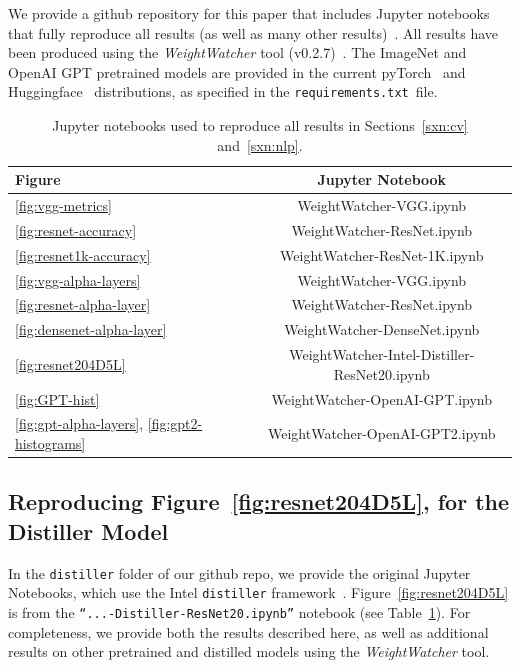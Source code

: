 We provide a github repository for this paper that includes Jupyter notebooks that fully reproduce all results (as well as many other results)~\cite{kdd20_sub_repo}.
All results have been produced using the \emph{WeightWatcher} tool (v0.2.7)~\cite{weightwatcher_package}.
The ImageNet and OpenAI GPT pretrained models are provided in the current 
pyTorch~\cite{pytorch} and Huggingface~\cite{huggingface} distributions, as specified in the \texttt{requirements.txt}~file. 

\begin{table}[t]
\small
\begin{center}
\begin{tabular}{|p{1in}|c|}
\hline
Figure & Jupyter Notebook \\
\hline
\ref{fig:vgg-metrics}                                 & WeightWatcher-VGG.ipynb \\
\ref{fig:resnet-accuracy}                             & WeightWatcher-ResNet.ipynb \\
\ref{fig:resnet1k-accuracy}                           & WeightWatcher-ResNet-1K.ipynb \\
\ref{fig:vgg-alpha-layers}                            & WeightWatcher-VGG.ipynb \\
\ref{fig:resnet-alpha-layer}                          & WeightWatcher-ResNet.ipynb \\
\ref{fig:densenet-alpha-layer}                        & WeightWatcher-DenseNet.ipynb \\
\hline
\ref{fig:resnet204D5L}                                & WeightWatcher-Intel-Distiller-ResNet20.ipynb \\
\hline
\ref{fig:GPT-hist}                                    & WeightWatcher-OpenAI-GPT.ipynb \\
\ref{fig:gpt-alpha-layers}, \ref{fig:gpt2-histograms} & WeightWatcher-OpenAI-GPT2.ipynb \\
\hline
\end{tabular}
\end{center}
\caption{Jupyter notebooks used to reproduce all results in Sections~\ref{sxn:cv} and~\ref{sxn:nlp}.}
\label{table:notebooks}
\end{table}


\subsection{Reproducing Figure~\ref{fig:resnet204D5L}, for the Distiller Model}

In the \texttt{distiller} folder of our github repo, 
we provide the original Jupyter Notebooks, which use the Intel \texttt{distiller} framework~\cite{distiller}.   %
Figure~\ref{fig:resnet204D5L} is from the  \texttt{``...-Distiller-ResNet20.ipynb''} notebook (see Table~\ref{table:notebooks}).  
For completeness, we provide both the results described here, as well as additional results on other pretrained and distilled models using the \emph{WeightWatcher} tool.


